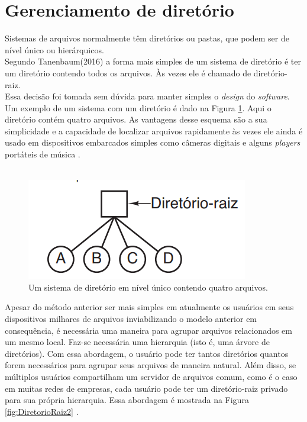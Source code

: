 \section{Gerenciamento de diretório}

Sistemas de arquivos normalmente têm diretórios ou pastas, que podem ser de nível único ou hierárquicos.\\
Segundo Tanenbaum(2016) a forma mais simples de um sistema de diretório é ter um diretório contendo todos os arquivos. Às vezes ele é chamado de diretório-raiz. \\Essa decisão foi tomada sem dúvida para manter simples o \emph{design} do \emph{software}. Um exemplo de um sistema com um diretório é dado na Figura \ref{fig:DiretorioRaiz}. Aqui o diretório contém quatro arquivos. As vantagens desse esquema são a sua simplicidade e a capacidade de localizar arquivos rapidamente às vezes ele ainda é usado em dispositivos embarcados simples como câmeras digitais e alguns \emph{players} portáteis de música \cite{Tanenbaum2016}. \\\\

\begin{figure}[htpb]
    \centering
   \includegraphics[scale=1]{imagens/DiretorioRaiz.png}
   \caption{Um sistema de diretório em nível único contendo
   quatro arquivos. \cite{Tanenbaum2016}}
   \label{fig:DiretorioRaiz}
\end{figure} 

Apesar do método anterior ser mais simples em atualmente os usuários em seus dispositivos milhares de arquivos inviabilizando o modelo anterior em consequência, é necessária uma maneira para agrupar arquivos relacionados em um mesmo local\cite{Tanenbaum2016}. 
Faz-se necessária uma hierarquia (isto é, uma árvore de diretórios). Com essa abordagem, o usuário pode ter tantos diretórios quantos forem necessários para agrupar seus arquivos de maneira natural. 
Além disso, se múltiplos usuários compartilham um servidor de arquivos comum, como é o caso em muitas redes de empresas, cada usuário pode ter um diretório-raiz privado para sua própria hierarquia. Essa abordagem é mostrada na Figura \ref{fig:DiretorioRaiz2} \cite{Tanenbaum2016}. 

